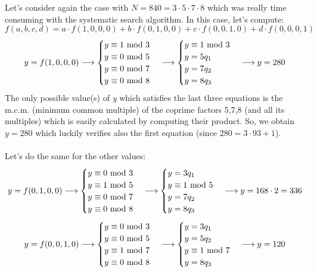 \newpage
\hfill\break
Let's consider again the case with $N=840=3\cdot5\cdot7\cdot8$ which was really time consuming with the systematic search algorithm. In this case, let's compute:
$$f(a,b,c,d)=a\cdot f(1,0,0,0)+b\cdot f(0,1,0,0)+c\cdot f(0,0,1,0)+d\cdot f(0,0,0,1)$$
\begin{equation*}
  y=f(1,0,0,0)\longrightarrow
  \begin{cases}
      y\equiv1\text{ mod }3\\
      y\equiv0\text{ mod }5\\
      y\equiv0\text{ mod }7\\
      y\equiv0\text{ mod }8
  \end{cases}\longrightarrow
  \begin{cases}
      y\equiv1\text{ mod }3\\
      y=5q_1\\
      y=7q_2\\
      y=8q_3
  \end{cases}\longrightarrow
  y=280
\end{equation*}
The only possible value(s) of \textit{y} which satisfies the last three equations is the m.c.m. (minimum common multiple) of the coprime factors 5,7,8 (and all its multiples) which is easily calculated by computing their product. So, we obtain $y=280$ which luckily verifies also the first equation (since $280=3\cdot93+1$).\\\\
Let's do the same for the other values:
\begin{equation*}
  y=f(0,1,0,0)\longrightarrow
  \begin{cases}
      y\equiv0\text{ mod }3\\
      y\equiv1\text{ mod }5\\
      y\equiv0\text{ mod }7\\
      y\equiv0\text{ mod }8
  \end{cases}\longrightarrow
  \begin{cases}
      y=3q_1\\
      y\equiv1\text{ mod }5\\
      y=7q_2\\
      y=8q_3
  \end{cases}\longrightarrow
  y=168\cdot2=336
\end{equation*}
\begin{equation*}
  y=f(0,0,1,0)\longrightarrow
  \begin{cases}
      y\equiv0\text{ mod }3\\
      y\equiv0\text{ mod }5\\
      y\equiv1\text{ mod }7\\
      y\equiv0\text{ mod }8
  \end{cases}\longrightarrow
  \begin{cases}
      y=3q_1\\
      y=5q_2\\
      y\equiv1\text{ mod }7\\
      y=8q_3
  \end{cases}\longrightarrow
  y=120
\end{equation*}
